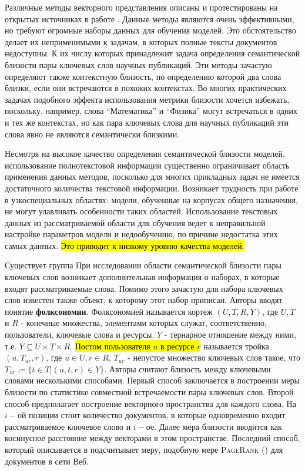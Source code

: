 Различные методы векторного представления описаны и протестированы на открытых источниках в работе \cite{embed_1}. Данные методы являются очень эффективными, но требуют огромные наборы данных для обучения моделей. Это обстоятельство делает их неприменимыми к задачам, в которых полные тексты документов недоступны. К их числу которых принадлежит задача определения семантической близости пары ключевых слов научных публикаций. Эти методы зачастую определяют также контекстную близость, по определению которой два слова близки, если они встречаются в похожих контекстах. Во многих практических задачах подобного эффекта использования метрики близости хочется избежать, поскольку, например, слова “Математика” и “Физика” могут встречаться в одних и тех же контекстах, но как пара ключевых слова для научных публикаций эти слова явно не являются  семантически близкими.

Несмотря на высокое качество определения семантической близости моделей, использование полнотекстовой информации существенно ограничивает область применения данных методов, посколько для многих прикладных задач не имеется достаточного количества текстовой информации. Возникает трудность при работе в узкоспециальных областях: модели, обученные на корпусах общего назначения, не могут улавливать особенности таких областей. Использование текстовых данных из рассматриваемой области для обучения ведет к неправильной настройке параметров модели и недообучению, по причине недостатка этих самых данных. \hl{Это приводит к низкому уровню качества моделей.}

Существует группа При исследовании области семантической близости пары ключевых слов возникает дополнительная информация о наборах, в которые входят рассматриваемые слова. Помимо этого зачастую для набора ключевых слов известен также объект, к которому этот набор приписан. Авторы \cite{folk} вводят понятие \textbf{фолксономии}. Фолксономией называется кортеж $(U, T, R, Y)$, где $U,T$ и $R$ - конечные множества, элементами которых служат, соответственно, пользователи, ключевые слова и ресурсы. $Y$ - тернарное отношение между ними, т.е. $Y  \subseteq U \times T \times R$. \hl{Постом пользователя $u$ в ресурсе $r$} называется тройка $(u, T_{ur}, r)$, где $u \in U, r \in R$, $T_{ur}$ - непустое множество ключевых слов такое, что $T_{ur}  \coloneqq \{t \in T | (u, t, r) \in Y\}$. Авторы \cite{folk_2} считают близость между ключевыми словами несколькими способами. Первый способ заключается в построении меры близости по статистике совместной встречаемости пары ключевых слов. Второй способ предполагает построение векторного пространства для каждого слова. На $i-$ой позиции стоит количество документов, в которые одновременно входит рассматриваемое ключевое слово и $i-$ое. Далее мера близости вводится как косинусное расстояние между векторами в этом пространстве. Последний способ, который описывается в \cite{folk} подсчитывает меру, подобную мере \textsc{PageRank} (\cite{pagerank}) для документов в сети Веб.

